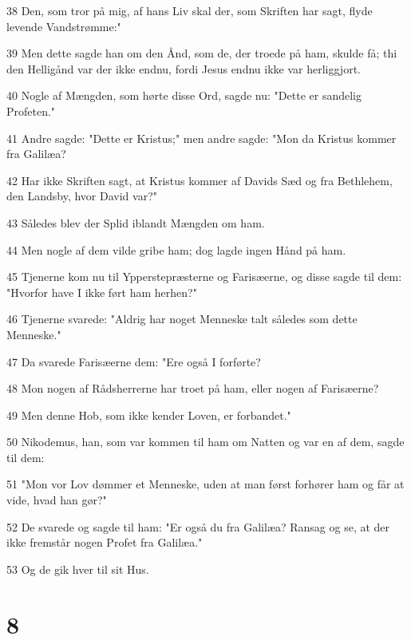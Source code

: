 \par 38 Den, som tror på mig, af hans Liv skal der, som Skriften har sagt, flyde levende Vandstrømme:"
\par 39 Men dette sagde han om den Ånd, som de, der troede på ham, skulde få; thi den Helligånd var der ikke endnu, fordi Jesus endnu ikke var herliggjort.
\par 40 Nogle af Mængden, som hørte disse Ord, sagde nu: "Dette er sandelig Profeten."
\par 41 Andre sagde: "Dette er Kristus;" men andre sagde: "Mon da Kristus kommer fra Galilæa?
\par 42 Har ikke Skriften sagt, at Kristus kommer af Davids Sæd og fra Bethlehem, den Landsby, hvor David var?"
\par 43 Således blev der Splid iblandt Mængden om ham.
\par 44 Men nogle af dem vilde gribe ham; dog lagde ingen Hånd på ham.
\par 45 Tjenerne kom nu til Ypperstepræsterne og Farisæerne, og disse sagde til dem: "Hvorfor have I ikke ført ham herhen?"
\par 46 Tjenerne svarede: "Aldrig har noget Menneske talt således som dette Menneske."
\par 47 Da svarede Farisæerne dem: "Ere også I forførte?
\par 48 Mon nogen af Rådsherrerne har troet på ham, eller nogen af Farisæerne?
\par 49 Men denne Hob, som ikke kender Loven, er forbandet."
\par 50 Nikodemus, han, som var kommen til ham om Natten og var en af dem, sagde til dem:
\par 51 "Mon vor Lov dømmer et Menneske, uden at man først forhører ham og får at vide, hvad han gør?"
\par 52 De svarede og sagde til ham: "Er også du fra Galilæa? Ransag og se, at der ikke fremstår nogen Profet fra Galilæa."
\par 53 Og de gik hver til sit Hus.

\chapter{8}

